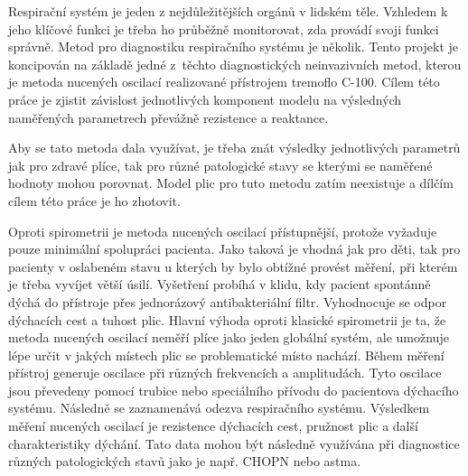 Respirační systém je jeden z nejdůležitějších orgánů v lidském těle. Vzhledem k jeho klíčové funkci je třeba ho průběžně monitorovat, zda provádí svoji funkci správně. 
Metod pro diagnostiku respiračního systému je několik. Tento projekt je koncipován na základě jedné z~těchto diagnostických neinvazivních metod, kterou je metoda nucených oscilací realizované přístrojem tremoflo C-100. Cílem této práce je zjistit závislost jednotlivých komponent modelu na výsledných naměřených parametrech převážně rezistence a reaktance. \cite{Vlcek2018}


Aby se tato metoda dala využívat, je třeba znát výsledky jednotlivých parametrů jak pro zdravé plíce, tak pro různé patologické stavy se kterými se naměřené hodnoty mohou porovnat. Model plic pro tuto metodu zatím neexistuje a dílčím cílem této práce je ho zhotovit. 


Oproti spirometrii je metoda nucených oscilací přístupnější, protože vyžaduje pouze minimální spolupráci pacienta. Jako taková je vhodná jak pro děti, tak pro pacienty v oslabeném stavu u kterých by bylo obtížné provést měření, při kterém je třeba vyvíjet větší úsilí. \cite{Vlcek2018} Vyšetření probíhá v klidu, kdy pacient spontánně dýchá do přístroje přes jednorázový antibakteriální filtr. Vyhodnocuje se odpor dýchacích cest a tuhost plic. \cite{Vlcek2018}
Hlavní výhoda oproti klasické spirometrii je ta, že metoda nucených oscilací neměří plíce jako jeden globální systém, ale umožnuje lépe určit v jakých místech plic se problematické místo nachází. \cite{Vlcek2018}
Během měření přístroj generuje oscilace při různých frekvencích a amplitudách. Tyto oscilace jsou převedeny pomocí trubice nebo speciálního přívodu do pacientova dýchacího systému. Následně se zaznamenává odezva respiračního systému. Výsledkem měření nucených oscilací je rezistence dýchacích cest, pružnost plic a další charakteristiky dýchání. Tato data mohou být následně využívána při diagnostice různých patologických stavů jako je např. CHOPN nebo astma. \cite{Vlcek2018}
